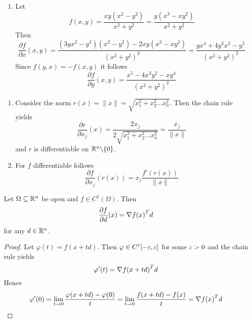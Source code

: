 \begin{examples}\hfill
    \begin{enumerate}
        \item Let
              \[
                  f(x,y) = \frac{xy(x^2 - y^2)}{x^2 + y^2} = \frac{y(x^3 - xy^2)}{x^2 + y^2}
              \]
              Then
              \[
                  \frac{\partial f}{\partial x}(x,y)
                  = \frac{(3yx^2 - y^3)(x^2 - y^2) - 2xy(x^3 - xy^2)}{{(x^2 + y^2)}^2}
                  = \frac{yx^4 + 4y^3x^2 - y^5}{{(x^2 + y^2)}^2}
              \]
              Since \( f(y,x) = - f(x,y)\) it follows
              \[
                  \frac{\partial f}{\partial y}(x,y) = \frac{x^5 - 4x^3y^2 - xy^4}{{(x^2 + y^2)}^2}
              \]

    \end{enumerate}
\end{examples}
\bigskip


\begin{examples}\hfill
    \begin{enumerate}
        \item Consider the norm \( r(x) = \|x\| = \sqrt{x_1^2 + x_2^2 \dots x_n^2} \). Then the chain rule yields
              \[
                  \frac{\partial r}{\partial x_j}(x) = \frac{2 x_j}{2 \sqrt{x_1^2 + x_2^2 \dots x_n^2}}
                  = \frac{x_j}{\|x\|}
              \]
              and \( r \) is differentiable on \( \mathbb{R}^n {\setminus} \{ 0 \} \).
        \item For \( f \) differentiable follows
              \[
                  \frac{\partial f}{\partial x_j}(r(x)) = x_j \frac{f'(r(x))}{\|x\|}
              \]
    \end{enumerate}
\end{examples}
\bigskip


\begin{lemma}\label{lemma:directional_derivative}
    Let \( \Omega \subseteq \mathbb{R}^n \) be open and \( f \in C^1(\Omega) \). Then
    \[
        \frac{\partial f}{\partial d}(x) = \nabla{f(x)}^T d
    \]
    for any \( d \in \mathbb{R}^n \).
\end{lemma}

\begin{proof}
    Let \( \varphi(t) = f(x + td) \). Then \( \varphi \in C^1[-\varepsilon, \varepsilon ] \) for some \( \varepsilon > 0 \)
    and the chain rule yields
    \[
        \varphi'(t) = {\nabla f(x + td)}^T d
    \]
    Hence
    \[
        \varphi'(0) = \lim_{t \to 0} \frac{\varphi(x + td) - \varphi(0)}{t} =
        \lim_{t \to 0} \frac{f(x + td) - f(x)}{t} = {\nabla f(x)}^T d
    \]
\end{proof}
\bigskip


